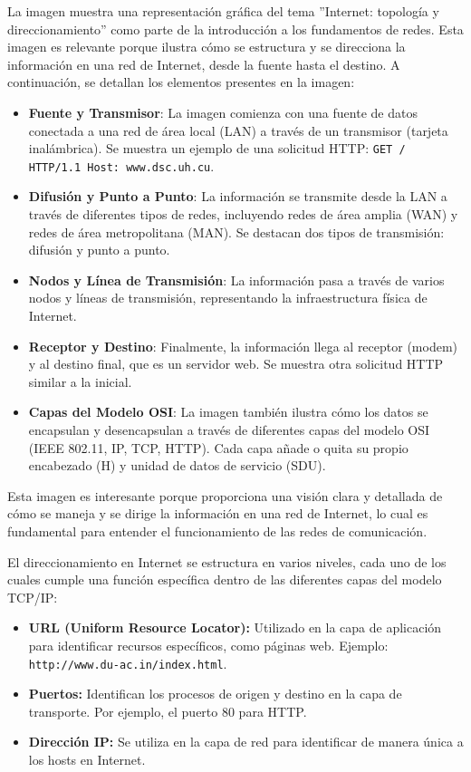 \documentclass[a4paper,12pt]{article}
\begin{document}
La imagen muestra una representación gráfica del tema ''Internet: topología y direccionamiento'' como parte de la introducción a los fundamentos de redes. Esta imagen es relevante porque ilustra cómo se estructura y se direcciona la información en una red de Internet, desde la fuente hasta el destino. A continuación, se detallan los elementos presentes en la imagen:

\begin{itemize}
    \item \textbf{Fuente y Transmisor}: La imagen comienza con una fuente de datos conectada a una red de área local (LAN) a través de un transmisor (tarjeta inalámbrica). Se muestra un ejemplo de una solicitud HTTP: \texttt{GET / HTTP/1.1 Host: www.dsc.uh.cu}.
    \item \textbf{Difusión y Punto a Punto}: La información se transmite desde la LAN a través de diferentes tipos de redes, incluyendo redes de área amplia (WAN) y redes de área metropolitana (MAN). Se destacan dos tipos de transmisión: difusión y punto a punto.
    \item \textbf{Nodos y Línea de Transmisión}: La información pasa a través de varios nodos y líneas de transmisión, representando la infraestructura física de Internet.
    \item \textbf{Receptor y Destino}: Finalmente, la información llega al receptor (modem) y al destino final, que es un servidor web. Se muestra otra solicitud HTTP similar a la inicial.
    \item \textbf{Capas del Modelo OSI}: La imagen también ilustra cómo los datos se encapsulan y desencapsulan a través de diferentes capas del modelo OSI (IEEE 802.11, IP, TCP, HTTP). Cada capa añade o quita su propio encabezado (H) y unidad de datos de servicio (SDU).
\end{itemize}

Esta imagen es interesante porque proporciona una visión clara y detallada de cómo se maneja y se dirige la información en una red de Internet, lo cual es fundamental para entender el funcionamiento de las redes de comunicación.


El direccionamiento en Internet se estructura en varios niveles, cada uno de los cuales cumple una función específica dentro de las diferentes capas del modelo TCP/IP:
\begin{itemize}
    \item \textbf{URL (Uniform Resource Locator):} Utilizado en la capa de aplicación para identificar recursos específicos, como páginas web. Ejemplo: \texttt{http://www.du-ac.in/index.html}.
    \item \textbf{Puertos:} Identifican los procesos de origen y destino en la capa de transporte. Por ejemplo, el puerto 80 para HTTP.
    \item \textbf{Dirección IP:} Se utiliza en la capa de red para identificar de manera única a los hosts en Internet.
\end{itemize}
\end{document}
